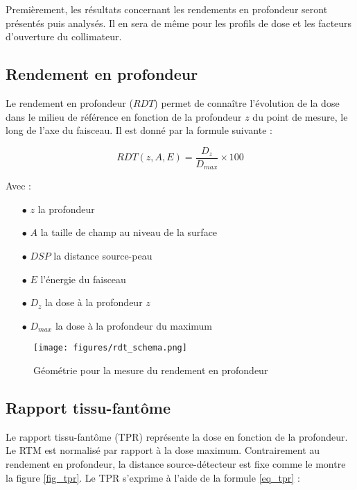 \documentclass{article}
\begin{document}
Premièrement, les résultats concernant les rendements en profondeur seront présentés puis analysés. Il en sera de même pour les profils de dose et les facteurs d'ouverture du collimateur.

\newpage
\subsection{Rendement en profondeur}

Le rendement en profondeur ($RDT$) permet de connaître l'évolution de la dose dans le milieu de référence en fonction de la profondeur $z$ du point de mesure, le long de l'axe du faisceau. Il est donné par la formule suivante :

\begin{equation}
    RDT(z, A, E) = \dfrac{D_z}{D_{max}} \times 100
    \label{eq_rdt}
\end{equation}

Avec :

\begin{itemize}
    \item[$\bullet$] $z$ la profondeur
    \item[$\bullet$] $A$ la taille de champ au niveau de la surface
    \item[$\bullet$] $DSP$ la distance source-peau
    \item[$\bullet$] $E$ l'énergie du faisceau
    \item[$\bullet$] $D_z$ la dose à la profondeur $z$
    \item[$\bullet$] $D_{max}$ la dose à la profondeur du maximum
\end{itemize}

\begin{figure}[h]
  \centering
  \texttt{[image: figures/rdt\_schema.png]}
  \caption{Géométrie pour la mesure du rendement en profondeur}
  \label{fig_rdt}
\end{figure}

\subsection{Rapport tissu-fantôme}

Le rapport tissu-fantôme (TPR) représente la dose en fonction de la profondeur. Le RTM est normalisé par rapport à la dose maximum. Contrairement au rendement en profondeur, la distance source-détecteur est fixe comme le montre la figure \ref*{fig_tpr}. Le TPR s'exprime à l'aide de la formule \ref{eq_tpr} :
\end{document}

